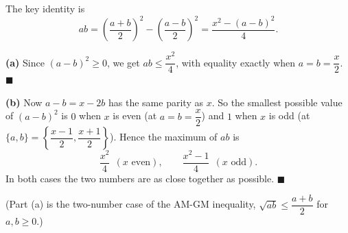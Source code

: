 The key identity is
\[ab=\left(\dfrac{a+b}2\right)^2-\left(\dfrac{a-b}2\right)^2=\dfrac{x^2-(a-b)^2}{4}.\]

\textbf{(a)} Since $(a-b)^2\ge0$, we get $ab\le\dfrac{x^2}4$, with equality exactly when $a=b=\dfrac x2$. $\blacksquare$

\textbf{(b)} Now $a-b=x-2b$ has the same parity as $x$. So the smallest possible value of $(a-b)^2$ is $0$ when $x$ is even (at $a=b=\dfrac x2$) and $1$ when $x$ is odd (at $\{a,b\}=\left\{\dfrac{x-1}2,\dfrac{x+1}2\right\}$). Hence the maximum of $ab$ is
\[\boxed{\dfrac{x^2}4\ \ (x\text{ even}),\qquad\dfrac{x^2-1}4\ \ (x\text{ odd}).}\]
In both cases the two numbers are as close together as possible. $\blacksquare$

(Part (a) is the two-number case of the AM-GM inequality, $\sqrt{ab}\le\dfrac{a+b}2$ for $a,b\ge0$.)
